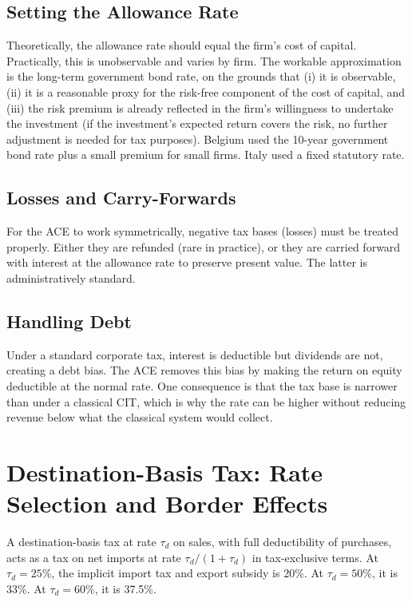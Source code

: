 \documentclass[11pt,a4paper]{article}
\begin{document}
\subsection{Setting the Allowance Rate}

Theoretically, the allowance rate should equal the firm's cost of capital. Practically, this is unobservable and varies by firm. The workable approximation is the long-term government bond rate, on the grounds that (i) it is observable, (ii) it is a reasonable proxy for the risk-free component of the cost of capital, and (iii) the risk premium is already reflected in the firm's willingness to undertake the investment (if the investment's expected return covers the risk, no further adjustment is needed for tax purposes). Belgium used the 10-year government bond rate plus a small premium for small firms. Italy used a fixed statutory rate.

\subsection{Losses and Carry-Forwards}

For the ACE to work symmetrically, negative tax bases (losses) must be treated properly. Either they are refunded (rare in practice), or they are carried forward with interest at the allowance rate to preserve present value. The latter is administratively standard.

\subsection{Handling Debt}

Under a standard corporate tax, interest is deductible but dividends are not, creating a debt bias. The ACE removes this bias by making the return on equity deductible at the normal rate. One consequence is that the tax base is narrower than under a classical CIT, which is why the rate can be higher without reducing revenue below what the classical system would collect.

\section{Destination-Basis Tax: Rate Selection and Border Effects}

A destination-basis tax at rate $\tau_d$ on sales, with full deductibility of purchases, acts as a tax on net imports at rate $\tau_d / (1 + \tau_d)$ in tax-exclusive terms. At $\tau_d = 25\%$, the implicit import tax and export subsidy is 20\%. At $\tau_d = 50\%$, it is 33\%. At $\tau_d = 60\%$, it is 37.5\%.
\end{document}

